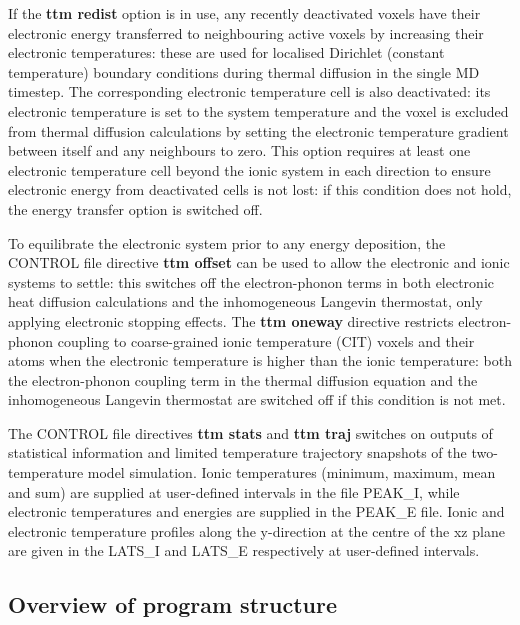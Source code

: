 If the {\bf ttm redist} option is in use, any recently deactivated voxels
have their electronic energy transferred to neighbouring active voxels
by increasing their electronic temperatures: these are used for localised
Dirichlet (constant temperature) boundary conditions during thermal
diffusion in the single MD timestep. The corresponding electronic
temperature cell is also deactivated: its electronic temperature is set to
the system temperature and the voxel is excluded from thermal diffusion
calculations by setting the electronic temperature gradient between itself
and any neighbours to zero. This option requires at least one electronic
temperature cell beyond the ionic system in each direction to ensure
electronic energy from deactivated cells is not lost: if this condition
does not hold, the energy transfer option is switched off.

To equilibrate the electronic system prior to any energy deposition,
the CONTROL file directive {\bf ttm offset} can be used to allow the
electronic and ionic systems to settle: this switches off the
electron-phonon terms in both electronic heat diffusion calculations
and the inhomogeneous Langevin thermostat, only applying
electronic stopping effects. The {\bf ttm oneway} directive restricts
electron-phonon coupling to coarse-grained ionic temperature (CIT)
voxels and their atoms when the electronic temperature is higher
than the ionic temperature: both the electron-phonon coupling term
in the thermal diffusion equation and the inhomogeneous Langevin
thermostat are switched off if this condition is not met.

The CONTROL file directives {\bf ttm stats} and {\bf ttm traj} switches
on outputs of statistical information and limited temperature trajectory
snapshots of the two-temperature model simulation. Ionic
temperatures (minimum, maximum, mean and sum) are supplied at
user-defined intervals in the file PEAK\_I, while electronic temperatures
and energies are supplied in the PEAK\_E file. Ionic and electronic
temperature profiles along the y-direction at the centre of the xz plane
are given in the LATS\_I and LATS\_E respectively at user-defined
intervals.

\subsection*{Overview of program structure}


